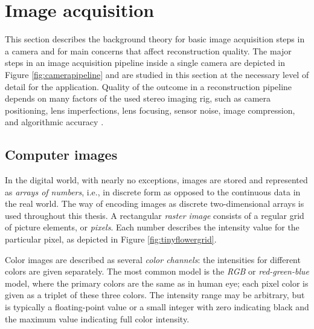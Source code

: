 \section{Image acquisition} \label{sec:image-acquisition}


This section describes the background theory for basic image acquisition steps in a camera and for main concerns that affect reconstruction quality.
The major steps in an image acquisition pipeline inside a single camera are depicted in Figure \ref{fig:camerapipeline} and are studied in this section at the necessary level of detail for the application.
Quality of the outcome in a reconstruction pipeline depends on many factors of the used stereo imaging rig, such as camera positioning, lens imperfections, lens focusing, sensor noise, image compression, and algorithmic accuracy \cite{hollsten2013imagequality,kyto2011method,rieke2009evaluation}.


\subsection{Computer images} \label{sec:computer-images}

In the digital world, with nearly no exceptions, images are stored and represented as \emph{arrays of numbers}, i.e., in discrete form as opposed to the continuous data in the real world.
The way of encoding images as discrete two-dimensional arrays is used throughout this thesis.
A rectangular \emph{raster image} consists of a regular grid of picture elements, or \emph{pixels}.
Each number describes the intensity value for the particular pixel, as depicted in Figure \ref{fig:tinyflowergrid}.
\cite[ch.~2.2]{trucco1998introductory}

Color images are described as several \emph{color channels}: the intensities for different colors are given separately.
The most common model is the \emph{RGB} or \emph{red-green-blue} model, where the primary colors are the same as in human eye; each pixel color is given as a triplet of these three colors.
The intensity range may be arbitrary, but is typically a floating-point value or a small integer with zero indicating black and the maximum value indicating full color intensity.
\cite{pitas2000digital}

